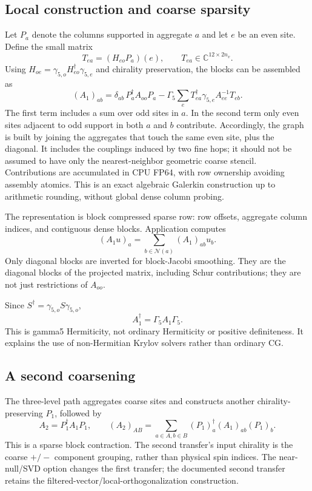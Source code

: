 \documentclass[11pt]{article}
\newcommand{\adj}{^{\dagger}}
\begin{document}
\subsection{Local construction and coarse sparsity}
Let $P_a$ denote the columns supported in aggregate $a$ and let $e$ be an
even site. Define the small matrix
\begin{equation}
 T_{ea}=(H_{eo}P_a)(e),\qquad T_{ea}\in\mathbb C^{12\times2n_v}.
\end{equation}
Using $H_{oe}=\gamma_{5,o}H_{eo}\adj\gamma_{5,e}$ and chirality preservation,
the blocks can be assembled as
\begin{equation}
 (A_1)_{ab}=\delta_{ab}\,P_a\adj A_{oo}P_a
 -\Gamma_5\sum_e T_{ea}\adj\gamma_{5,e}A_{ee}^{-1}T_{eb}.
 \label{eq:localassembly}
\end{equation}
The first term includes a sum over odd sites in $a$. In the second term only
even sites adjacent to odd support in both $a$ and $b$ contribute. Accordingly,
the graph is built by joining the aggregates that touch the same even site,
plus the diagonal. It includes the couplings induced by two fine hops; it
should not be assumed to have only the nearest-neighbor geometric coarse
stencil. Contributions are accumulated in CPU FP64, with row ownership
avoiding assembly atomics. This is an exact algebraic Galerkin construction
up to arithmetic rounding, without global dense column probing.

The representation is block compressed sparse row: row offsets, aggregate
column indices, and contiguous dense blocks. Application computes
\begin{equation}
 (A_1u)_a=\sum_{b\in\mathcal N(a)}(A_1)_{ab}u_b.
\end{equation}
Only diagonal blocks are inverted for block-Jacobi smoothing. They are the
diagonal blocks of the projected matrix, including Schur contributions;
they are not just restrictions of $A_{oo}$.

Since $S\adj=\gamma_{5,o}S\gamma_{5,o}$,
\begin{equation}
 A_1\adj=\Gamma_5A_1\Gamma_5.
\end{equation}
This is gamma5 Hermiticity, not ordinary Hermiticity or positive definiteness.
It explains the use of non-Hermitian Krylov solvers rather than ordinary CG.

\subsection{A second coarsening}
The three-level path aggregates coarse sites and constructs another
chirality-preserving $P_1$, followed by
\begin{equation}
 A_2=P_1\adj A_1P_1,\qquad
 (A_2)_{AB}=\sum_{a\in A,b\in B}(P_1)_a\adj(A_1)_{ab}(P_1)_b.
\end{equation}
This is a sparse block contraction. The second transfer's input chirality
is the coarse $+/-$ component grouping, rather than physical spin indices.
The near-null/SVD option changes the first transfer; the documented second
transfer retains the filtered-vector/local-orthogonalization construction.
\end{document}
